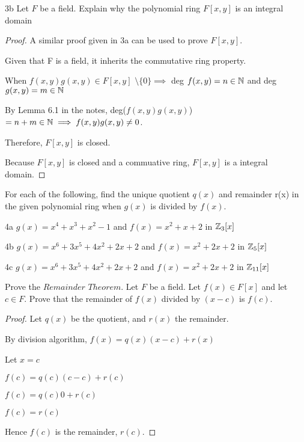 \begin{question}{3b}
Let $F$ be a field. Explain why the polynomial ring $F[x,y]$ is an integral domain

\begin{proof}
A similar proof given in 3a can be used to prove $F[x,y]$.

Given that F is a field, it inherits the commutative ring property.

When $f(x,y)g(x,y) \in F[x,y]$  $\setminus\{0\} \implies$ deg $f(x,y) = n\in \mathbb{N}$ and deg $g(x,y) = m \in \mathbb{N}$

By Lemma 6.1 in the notes, deg($f(x,y)g(x,y)$)$=n+m \in \mathbb{N} \implies f(x,y)g(x,y) \neq 0$.

Therefore, $F[x,y]$ is closed.

Because $F[x,y]$ is closed and a commuative ring, $F[x,y]$ is a integral domain.
\end{proof}
\end{question}
\pagebreak
\begin{question}{4}
For each of the following, find the unique quotient $q(x)$ and remainder r(x) in the given polynomial ring when $g(x)$ is divided by $f(x)$.
\end{question}
\begin{question}{4a}
$g(x) = x^4 + x^3 + x^2 -1$ and $f(x)=x^2+x+2$ in $\mathbb{Z}_3[x]$
\vspace{10cm}
\end{question}
\begin{question}{4b}
$g(x) = x^6 + 3x^5 + 4x^2 +2x + 2$ and $f(x)=x^2+2x+2$ in $\mathbb{Z}_5[x]$
\vspace{10cm}
\end{question}
\begin{question}{4c}
$g(x) = x^6 + 3x^5 + 4x^2 +2x +2$ and $f(x)=x^2+2x+2$ in $\mathbb{Z}_{11}[x]$
\vspace{10cm}
\end{question}
\begin{question}{5}
Prove the $Remainder$ $Theorem$. Let $F$ be a field. Let $f(x) \in F[x]$ and let $c \in F$. Prove that the remainder of $f(x)$ divided by $(x-c)$ is $f(c)$.

\begin{proof}
Let $q(x)$ be the quotient, and $r(x)$ the remainder.

By division algorithm, $f(x) = q(x)(x-c) + r(x)$

Let $x = c$

$f(c) = q(c)(c-c) + r(c)$

$f(c) = q(c)0 + r(c)$

$f(c) = r(c)$

Hence $f(c)$ is the remainder, $r(c)$.

\end{proof}
\end{question}

